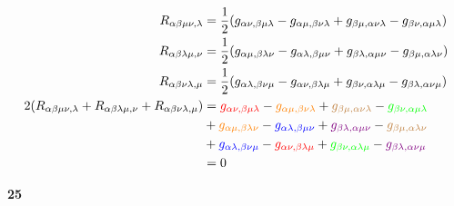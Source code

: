 \documentclass[gr-notes.tex]{subfiles}
\begin{document}
\begin{align*}
  R_{\alpha\beta\mu\nu,\lambda} &=
  \frac{1}{2} (
    g_{\alpha\nu,\beta\mu\lambda} -
    g_{\alpha\mu,\beta\nu\lambda} +
    g_{\beta\mu,\alpha\nu\lambda} -
    g_{\beta\nu,\alpha\mu\lambda}
  )
  \\
  R_{\alpha\beta\lambda\mu,\nu} &=
  \frac{1}{2} (
    g_{\alpha\mu,\beta\lambda\nu} -
    g_{\alpha\lambda,\beta\mu\nu} +
    g_{\beta\lambda,\alpha\mu\nu} -
    g_{\beta\mu,\alpha\lambda\nu}
  )
  \\
  R_{\alpha\beta\nu\lambda,\mu} &=
  \frac{1}{2} (
    g_{\alpha\lambda,\beta\nu\mu} -
    g_{\alpha\nu,\beta\lambda\mu} +
    g_{\beta\nu,\alpha\lambda\mu} -
    g_{\beta\lambda,\alpha\nu\mu}
  )
  \\
  2 (
    R_{\alpha\beta\mu\nu,\lambda} +
    R_{\alpha\beta\lambda\mu,\nu} +
    R_{\alpha\beta\nu\lambda,\mu}
  ) &=
  {\color{red} g_{\alpha\nu,\beta\mu\lambda}} -
  {\color{orange} g_{\alpha\mu,\beta\nu\lambda}} +
  {\color{brown} g_{\beta\mu,\alpha\nu\lambda}} -
  {\color{green} g_{\beta\nu,\alpha\mu\lambda}}
  \\* &+
  {\color{orange} g_{\alpha\mu,\beta\lambda\nu}} -
  {\color{blue} g_{\alpha\lambda,\beta\mu\nu}} +
  {\color{violet} g_{\beta\lambda,\alpha\mu\nu}} -
  {\color{brown} g_{\beta\mu,\alpha\lambda\nu}}
  \\* &+
  {\color{blue} g_{\alpha\lambda,\beta\nu\mu}} -
  {\color{red} g_{\alpha\nu,\beta\lambda\mu}} +
  {\color{green} g_{\beta\nu,\alpha\lambda\mu}} -
  {\color{violet} g_{\beta\lambda,\alpha\nu\mu}}
  \\* &=
  0
\end{align*}


\textbf{25}
\end{document}
